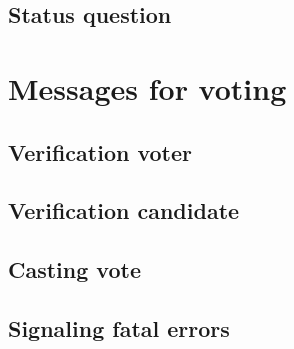 \subsection{Status question}\label{sec5:status-question}

\section{Messages for voting}\label{sec5:messages-voting}

\subsection{Verification voter}\label{sec5:verification-voter}

\subsection{Verification candidate}\label{sec5:verif-cand}

\subsection{Casting vote}\label{sec5:casting-vote}

\subsection{Signaling fatal errors}\label{sec5:sign-fatal-errors}

